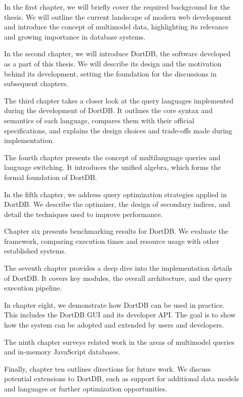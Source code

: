 \begin{description}
    \item[] In the first chapter, we will briefly cover the required background for the thesis. We will outline the current landscape of modern web development and introduce the concept of multimodel data, highlighting its relevance and growing importance in database systems.
    \item[] In the second chapter, we will introduce DortDB, the software developed as a part of this thesis. We will describe its design and the motivation behind its development, setting the foundation for the discussions in subsequent chapters.
    \item[] The third chapter takes a closer look at the query languages implemented during the development of DortDB. It outlines the core syntax and semantics of each language, compares them with their official specifications, and explains the design choices and trade-offs made during implementation.
    \item[] The fourth chapter presents the concept of multilanguage queries and language switching. It introduces the unified algebra, which forms the formal foundation of DortDB.
    \item[] In the fifth chapter, we address query optimization strategies applied in DortDB. We describe the optimizer, the design of secondary indices, and detail the techniques used to improve performance.
    \item[] Chapter six presents benchmarking results for DortDB. We evaluate the framework, comparing execution times and resource usage with other established systems.
    \item[]  The seventh chapter provides a deep dive into the implementation details of DortDB. It covers key modules, the overall architecture, and the query execution pipeline.
    \item[] In chapter eight, we demonstrate how DortDB can be used in practice. This includes the DortDB GUI and its developer API. The goal is to show how the system can be adopted and extended by users and developers.
    \item[] The ninth chapter surveys related work in the areas of multimodel queries and in-memory JavaScript databases.
    \item[] Finally, chapter ten outlines directions for future work. We discuss potential extensions to DortDB, such as support for additional data models and languages or further optimization opportunities.
\end{description}

